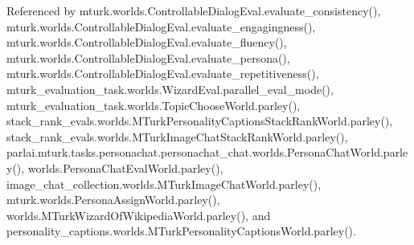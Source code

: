 Referenced by mturk.\+worlds.\+Controllable\+Dialog\+Eval.\+evaluate\+\_\+consistency(), mturk.\+worlds.\+Controllable\+Dialog\+Eval.\+evaluate\+\_\+engagingness(), mturk.\+worlds.\+Controllable\+Dialog\+Eval.\+evaluate\+\_\+fluency(), mturk.\+worlds.\+Controllable\+Dialog\+Eval.\+evaluate\+\_\+persona(), mturk.\+worlds.\+Controllable\+Dialog\+Eval.\+evaluate\+\_\+repetitiveness(), mturk\+\_\+evaluation\+\_\+task.\+worlds.\+Wizard\+Eval.\+parallel\+\_\+eval\+\_\+mode(), mturk\+\_\+evaluation\+\_\+task.\+worlds.\+Topic\+Choose\+World.\+parley(), stack\+\_\+rank\+\_\+evals.\+worlds.\+M\+Turk\+Personality\+Captions\+Stack\+Rank\+World.\+parley(), stack\+\_\+rank\+\_\+evals.\+worlds.\+M\+Turk\+Image\+Chat\+Stack\+Rank\+World.\+parley(), parlai.\+mturk.\+tasks.\+personachat.\+personachat\+\_\+chat.\+worlds.\+Persona\+Chat\+World.\+parley(), worlds.\+Persona\+Chat\+Eval\+World.\+parley(), image\+\_\+chat\+\_\+collection.\+worlds.\+M\+Turk\+Image\+Chat\+World.\+parley(), mturk.\+worlds.\+Persona\+Assign\+World.\+parley(), worlds.\+M\+Turk\+Wizard\+Of\+Wikipedia\+World.\+parley(), and personality\+\_\+captions.\+worlds.\+M\+Turk\+Personality\+Captions\+World.\+parley().

